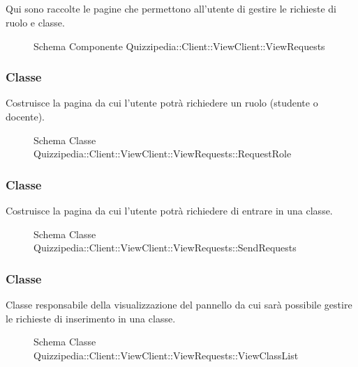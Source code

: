 \subsection{}
Qui sono raccolte le pagine che permettono all'utente di gestire le richieste di ruolo e classe.
\begin{figure}[H]
\centering
\noindent{}
\caption[Schema Componente Quizzipedia::Client::ViewClient::ViewRequests]{Schema Componente Quizzipedia::Client::ViewClient::ViewRequests}
\end{figure}
\subsubsection{Classe }
Costruisce la pagina da cui l'utente potrà richiedere un ruolo (studente o docente).
\begin{figure}[H]
\centering
\noindent{}
\caption[Schema Classe RequestRole]{Schema Classe Quizzipedia::Client::ViewClient::ViewRequests::RequestRole}
\end{figure}
\subsubsection{Classe }
Costruisce la pagina da cui l'utente potrà richiedere di entrare in una classe.
\begin{figure}[H]
\centering
\noindent{}
\caption[Schema Classe SendRequests]{Schema Classe Quizzipedia::Client::ViewClient::ViewRequests::SendRequests}
\end{figure}
\subsubsection{Classe }
Classe responsabile della visualizzazione del pannello da cui sarà possibile gestire le richieste di inserimento in una classe.
\begin{figure}[H]
\centering
\noindent{}
\caption[Schema Classe ViewClassList]{Schema Classe Quizzipedia::Client::ViewClient::ViewRequests::ViewClassList}
\end{figure}
